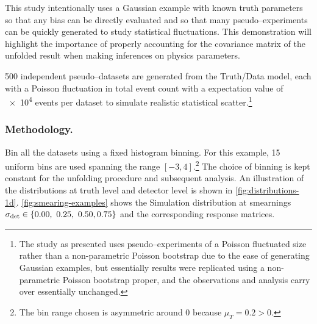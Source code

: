         This study intentionally uses a Gaussian example with known truth parameters so that any bias can be directly evaluated and so that many pseudo--experiments can be quickly generated to study statistical fluctuations.
        This demonstration will highlight the importance of properly accounting for the covariance matrix of the unfolded result when making inferences on physics parameters.
        
         \num{500} independent pseudo--datasets are generated from the Truth/Data model, each with a Poisson fluctuation in total event count with a expectation value of \num{e4} events per dataset to simulate realistic statistical scatter.\footnote{The study as presented uses pseudo--experiments of a Poisson fluctuated size rather than a non-parametric Poisson bootstrap due to the ease of generating Gaussian examples, but essentially results were replicated using a non-parametric Poisson bootstrap proper, and the observations and analysis carry over essentially unchanged.}
        
        \subsubsection{Methodology.}
        \label{subsec:methodology}
            Bin all the datasets using a fixed histogram binning. For this example, 15 uniform bins are used spanning the range $[-3,4]$.\footnote{The bin range chosen is asymmetric around 0 because \(\mu_T = 0.2 > 0\).}
            The choice of binning is kept constant for the unfolding procedure and subsequent analysis.
            An illustration of the distributions at truth level and detector level is shown in \cref{fig:distributions-1d}.
            \cref{fig:smearing-examples} shows the Simulation distribution at smearnings \(\sigma_{\text{det}}\in \qty{\numlist[list-final-separator = {, }]{0.00; 0.25; 0.50; 0.75}}\) and the corresponding response matrices.
            
